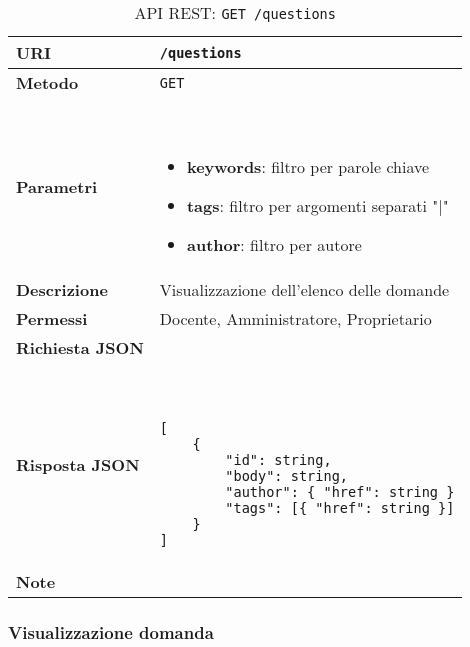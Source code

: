         \begin{table}[H]
            \begin{center}
                \begin{tabular}{p{} p{}}
                    \toprule
                    \textbf{URI} & \texttt{/questions} \\ \midrule
                    \textbf{Metodo} & \texttt{GET} \\ \midrule
                    \textbf{Parametri} & \
                        \begin{itemize}
                            \item \textbf{keywords}: filtro per parole chiave
                            \item \textbf{tags}: filtro per argomenti separati "|" 
                            \item \textbf{author}: filtro per autore
                        \end{itemize}
                        \\ \midrule
                    \textbf{Descrizione} & Visualizzazione dell'elenco delle domande \\ \midrule
                    \textbf{Permessi} & Docente, Amministratore, Proprietario  \\ \midrule
                    \textbf{Richiesta JSON} & \\ \midrule
                    \textbf{Risposta JSON} & \
                        \begin{lstlisting}[basicstyle={\ttfamily}]
[
    {
        "id": string,
        "body": string,
        "author": { "href": string }
        "tags": [{ "href": string }]
    }
]
                        \end{lstlisting}
                        \\ \midrule
                    \textbf{Note} & \\
                    \bottomrule
                \end{tabular}
                \caption{API REST: \texttt{GET /questions}}
            \end{center}
        \end{table}

    \subsubsection{Visualizzazione domanda}

